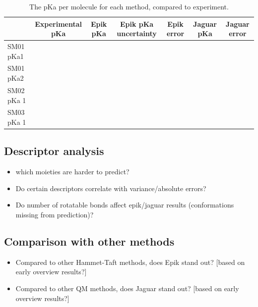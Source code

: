\documentclass[9pt,lineno]{elife}
\begin{document}
\begin{table}[H]
\centering
\caption{The pKa per molecule for each method, compared to experiment.}
\label{tab:molecule-micro}
\begin{tabular}{l|llllll}
           & \multicolumn{1}{c}{Experimental pKa} & \multicolumn{1}{c}{Epik pKa} & \multicolumn{1}{c}{Epik pKa uncertainty} & \multicolumn{1}{c}{Epik error} & \multicolumn{1}{c}{Jaguar pKa} & \multicolumn{1}{c}{Jaguar error} \\ \hline
SM01 pKa1  &                                      &                              &                                          &                                &                                &                                  \\
SM01 pKa2  &                                      &                              &                                          &                                &                                &                                  \\
SM02 pKa 1 &                                      &                              &                                          &                                &                                &                                  \\
SM03 pKa 1 &                                      &                              &                                          &                                &                                &                                 
\end{tabular}
\end{table}


\subsection{Descriptor analysis}
\begin{itemize}
    \item which moieties are harder to predict?
    \item Do certain descriptors correlate with variance/absolute errors?
    \item Do number of rotatable bonds affect epik/jaguar results (conformations missing from prediction)?
\end{itemize}

\subsection {Comparison with other methods}
\begin{itemize}
    \item Compared to other Hammet-Taft methods, does Epik stand out? [based on early overview results?]
    \item Compared to other QM methods, does Jaguar stand out? [based on early overview results?]
\end{itemize}
\end{document}
